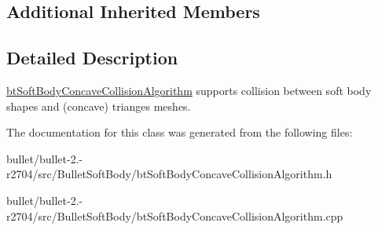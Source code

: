 \subsection*{Additional Inherited Members}


\subsection{Detailed Description}
\hyperlink{classbt_soft_body_concave_collision_algorithm}{bt\+Soft\+Body\+Concave\+Collision\+Algorithm} supports collision between soft body shapes and (concave) trianges meshes. 

The documentation for this class was generated from the following files\+:\begin{DoxyCompactItemize}
\item 
bullet/bullet-\/2.-\/r2704/src/\+Bullet\+Soft\+Body/bt\+Soft\+Body\+Concave\+Collision\+Algorithm.\+h\item 
bullet/bullet-\/2.-\/r2704/src/\+Bullet\+Soft\+Body/bt\+Soft\+Body\+Concave\+Collision\+Algorithm.\+cpp\end{DoxyCompactItemize}
